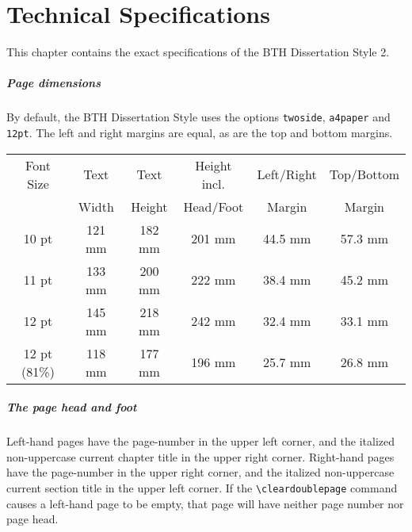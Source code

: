 
\chapter{Technical Specifications}
This chapter contains the exact specifications of the BTH Dissertation Style 2.

\paragraph*{Page dimensions}
By default, the BTH Dissertation Style uses the options \verb|twoside|, \verb|a4paper| and \verb|12pt|.
The left and right margins are equal, as are the top and bottom margins.
\\[\baselineskip]
\begin{tabular}{|c|c|c|c|c|c|}\hline
Font Size &  Text   &  Text   & Height incl.& Left/Right & Top/Bottom \\
          &  Width  &  Height &  Head/Foot  &   Margin   & Margin     \\ \hline
 10 pt    &  121 mm &  182 mm &  201 mm     &  44.5 mm   &  57.3 mm   \\
 11 pt    &  133 mm &  200 mm &  222 mm     &  38.4 mm   &  45.2 mm   \\
 12 pt    &  145 mm &  218 mm &  242 mm     &  32.4 mm   &  33.1 mm   \\
12 pt (81\%)& 118 mm & 177 mm &  196 mm     &  25.7 mm   &  26.8 mm   \\ \hline
\end{tabular}

\paragraph*{The page head and foot}
Left-hand pages have the page-number in the upper left corner, and the italized non-uppercase current chapter title in the upper right corner.
Right-hand pages have the page-number in the upper right corner, and the italized non-uppercase current section title in the upper left corner.
If the \verb|\cleardoublepage| command causes a left-hand page to be empty, that page will have neither page number nor page head.

